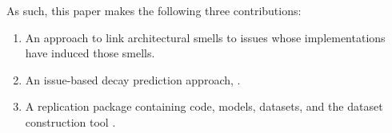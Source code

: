 As such, this paper makes the following three contributions:
\begin{enumerate}[leftmargin=*]
    \item An approach to link architectural smells to issues whose implementations have induced those smells.
    \item An issue-based decay prediction approach, \approach.
    \item A replication package containing code, models, datasets, and the dataset construction tool \cite{replication}.
\end{enumerate}
